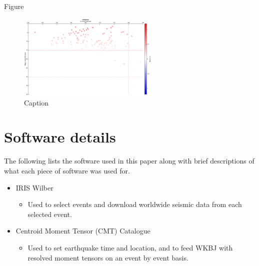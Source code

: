 \documentclass[11pt,a4paper]{article}
\begin{document}
Figure 
\begin{figure}
	\centering
	\includegraphics[width=0.6\textwidth]{figures/mindanao/mindanao_longitude}
	\caption{Caption}
\end{figure}

\appendix
\section{Software details}
\label{app:Software}
The following lists the software used in this paper along with brief descriptions of what each piece of software was used for.
\begin{itemize}
	\item IRIS Wilber
	\begin{itemize}
		\item Used to select events and download worldwide seismic data from each selected event.
	\end{itemize}
	\item Centroid Moment Tensor (CMT) Catalogue
	\begin{itemize}
		\item Used to set earthquake time and location, and to feed WKBJ with resolved moment tensors on an event by event basis.
	\end{itemize}
\end{itemize}

\newpage


\end{document}
